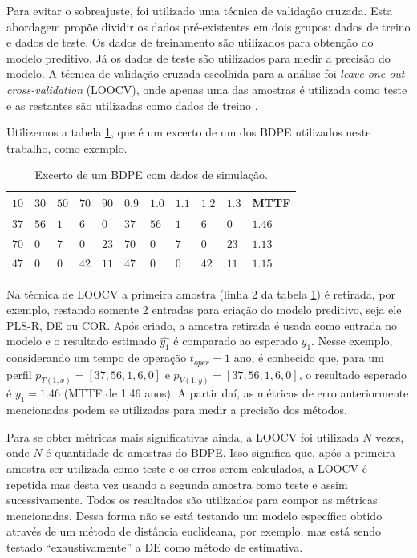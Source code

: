 Para evitar o sobreajuste, foi utilizado uma técnica de validação cruzada. Esta abordagem propõe dividir os dados pré-existentes em dois grupos: dados de treino e dados de teste. Os dados de treinamento são utilizados para obtenção do modelo preditivo. Já os dados de teste são utilizados para medir a precisão do modelo. A técnica de validação cruzada escolhida para a análise foi \textit{leave-one-out cross-validation} (LOOCV), onde apenas uma das amostras é utilizada como teste e as restantes são utilizadas como dados de treino \cite{James2013}.

Utilizemos a tabela \ref{tb:exemplo_cross_validation}, que é um excerto de um dos BDPE utilizados neste trabalho, como exemplo.  
\begin{table}[H]
	\centering
	\caption{Excerto de um BDPE com dados de simulação.}
	\begin{tabular}{@{}l|l|l|l|l|l|l|l|l|l|l@{}}
		\toprule
		$10$ & $30$ & $50$ & $70$ & $90$ & $0.9$ & $1.0$ & $1.1$ & $1.2$ & $1.3$ & MTTF \\ \midrule
		$37$ & $56$ & $1$ & $6$ & $0$ & $37$ & $56$ & $1$ & $6$ & $0$ & $1.46$ \\
		$70$ & $0$ & $7$ & $0$ & $23$ & $70$ & $0$ & $7$ & $0$ & $23$ & $1.13$ \\
		$47$ & $0$ & $0$ & $42$ & $11$ & $47$ & $0$ & $0$ & $42$ & $11$ & $1.15$ \\
		\bottomrule
	\end{tabular}
	\label{tb:exemplo_cross_validation}
\end{table}
Na técnica de LOOCV a primeira amostra (linha 2 da tabela \ref{tb:exemplo_cross_validation}) é retirada, por exemplo, restando somente 2 entradas para criação do modelo preditivo, seja ele PLS-R, DE ou COR. Após criado, a amostra retirada é usada como entrada no modelo e o resultado estimado $\hat{y_1}$ é comparado ao esperado $y_1$. Nesse exemplo, considerando um tempo de operação $t_{oper}=1$ ano, é conhecido que, para um perfil $p_{T(1,x)}=[37,56,1,6,0]$ e $p_{V(1,y)}=[37,56,1,6,0]$, o resultado esperado é $y_1=1.46$ (MTTF de 1.46 anos). A partir daí, as métricas de erro anteriormente mencionadas podem se utilizadas para medir a precisão dos métodos.

Para se obter métricas mais significativas ainda, a LOOCV foi utilizada $N$ vezes, onde $N$ é quantidade de amostras do BDPE. Isso significa que, após a primeira amostra ser utilizada como teste e os erros serem calculados, a LOOCV é repetida mas desta vez usando a segunda amostra como teste e assim sucessivamente. Todos os resultados são utilizados para compor as métricas mencionadas. Dessa forma não se está testando um modelo específico obtido através de um método de distância euclideana, por exemplo, mas está sendo testado ``exaustivamente'' a DE como método de estimativa.

